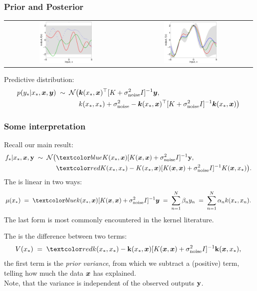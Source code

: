 \begin{frame}
\frametitle{Prior and Posterior}

\begin{center}
\begin{tabular}{cc}
\includegraphics[width=0.45\textwidth]{priorpost} &
{\includegraphics[width=0.45\textwidth]{priorpost1}}
\end{tabular}
\end{center}

Predictive distribution:
\[
\begin{split}
p(y_*|x_*,\bm x,\bm y)\;\sim\;{\cal N}\big(&\bm k(x_*,\bm x)^\top
[K+\sigma_{\rm noise}^2I]^{-1}\bm y,\\
&k(x_*,x_*)+\sigma_{\rm noise}^2 - \bm k(x_*,\bm x)^\top 
[K+\sigma_{\rm noise}^2I]^{-1}\bm k(x_*,\bm x)\big)
\end{split}
\]
\end{frame}

\begin{frame}
\frametitle{Some interpretation}

Recall our main result:
\[
\begin{split}
f_*|x_*,\bfx,{\bf y}\;\sim\; {\cal N}\big(&\Blue{K(x_*,\bfx)
[K(\bfx,\bfx)+\sigma_\mathrm{noise}^2I]^{-1}{\bf y},}\\
&\Red{K(x_*,x_*)-K(x_*,\bfx)[K(\bfx,\bfx)+\sigma_\mathrm{noise}^2I]^{-1}K(\bfx,x_*)}\big).
\end{split}
\]
The  is linear in two ways:
\[
\mu(x_*)\;=\;\Blue{k(x_*,\bfx)[K(\bfx,\bfx)+\sigma_\mathrm{noise}^2I]^{-1}\bfy}
\;=\;\sum_{n=1}^N\beta_n y_n\;=\;
\sum_{n=1}^N\alpha_nk(x_*,x_n).
\]
The last form is most commonly encountered in the kernel literature.

The  is the difference between two terms:
\[
V(x_*)\;=\;\Red{k(x_*,x_*)-{\bf k}(x_*,\bfx)
[K(\bfx,\bfx)+\sigma_\mathrm{noise}^2I]^{-1}{\bf k}(\bfx,x_*)},
\]
the first term is the \emph{prior variance}, from which we subtract
a (positive) term, telling how much the data $\bm x$ has
explained.\\
Note, that the variance is independent of the observed
outputs ${\bf y}$.
\end{frame}



